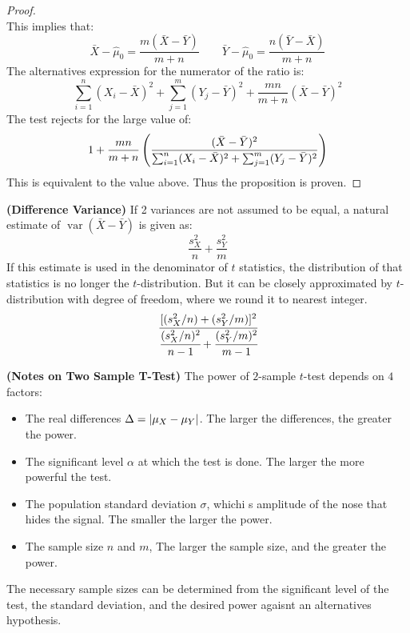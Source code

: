 \begin{proof}
\begin{equation*}
    \end{equation*}
    This implies that:
    \begin{equation*}
        \bar{X} - \hat{\mu}_0 = \frac{m(\bar{X} - \bar{Y})}{m+n} \qquad \bar{Y} - \hat{\mu}_0 = \frac{n(\bar{Y} - \bar{X})}{m+n}
    \end{equation*}
    The alternatives expression for the numerator of the ratio is:
    \begin{equation*}
        \sum^n_{i=1}(X_i - \bar{X})^2 + \sum^m_{j=1}(Y_j - \bar{Y})^2 + \frac{mn}{m+n}(\bar{X} - \bar{Y})^2
    \end{equation*}
    The test rejects for the large value of:
    \begin{equation*}
        1 + \frac{mn}{m+n}\left(  \frac{(\bar{X} - \bar{Y})^2}{\sum^n_{i=1} (X_i - \bar{X})^2  + \sum^m_{j=1}(Y_j - \bar{Y})^2}  \right)
    \end{equation*}
    This is equivalent to the value above. Thus the proposition is proven.
\end{proof}

\begin{remark}{\textbf{(Difference Variance)}}
    If 2 variances are not assumed to be equal, a natural estimate of $\operatorname{var}(\bar{X} - \bar{Y})$ is given as:
    \begin{equation*}
        \frac{s_X^2}{n} + \frac{s_Y^2}{m}
    \end{equation*}
    If this estimate is used in the denominator of $t$ statistics, the distribution of that statistics is no longer the $t$-distribution. But it can be closely approximated by $t$-distribution with degree of freedom, where we round it to nearest integer.
    \begin{equation*}
        \cfrac{[(s_X^2/n) + (s^2_Y/m)]^2}{\cfrac{(s_X^2/n)^2}{n-1} + \cfrac{(s_Y^2/m)^2}{m-1}}
    \end{equation*}
\end{remark}

\begin{remark}{\textbf{(Notes on Two Sample T-Test)}}
    The power of $2$-sample $t$-test depends on $4$ factors:
    \begin{itemize}
        \item The real differences $\Delta = \left| \mu_X - \mu_Y \right|$. The larger the differences, the greater the power. 
        \item The significant level $\alpha$ at which the test is done. The larger the more powerful the test. 
        \item The population standard deviation $\sigma$, whichi s amplitude of the nose that hides the signal. The smaller the larger the power. 
        \item The sample size $n$ and $m$, The larger the sample size, and the greater the power. 
    \end{itemize}
    The necessary sample sizes can be determined from the significant level of the test, the standard deviation, and the desired power agaisnt an alternatives hypothesis. 
\end{remark}

